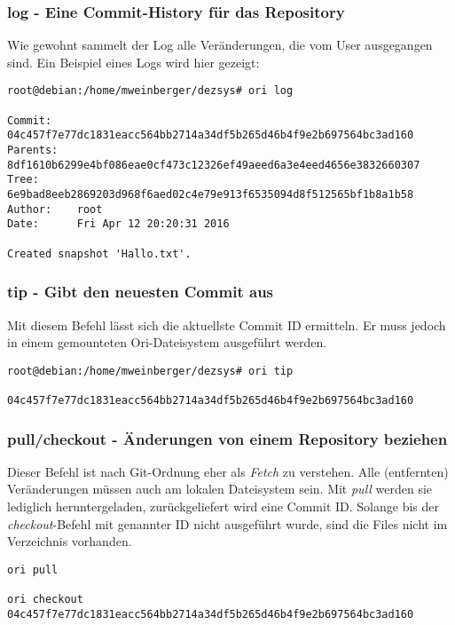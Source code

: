 \subsubsection{log - Eine Commit-History für das Repository}
\label{subsubsec:log - Eine Commit-History für das Repository}
Wie gewohnt sammelt der Log alle Veränderungen, die vom User ausgegangen sind. Ein Beispiel eines Logs wird hier gezeigt:
\begin{lstlisting}[frame=single, caption=log]
root@debian:/home/mweinberger/dezsys# ori log

Commit:    04c457f7e77dc1831eacc564bb2714a34df5b265d46b4f9e2b697564bc3ad160
Parents:   8df1610b6299e4bf086eae0cf473c12326ef49aeed6a3e4eed4656e3832660307
Tree:      6e9bad8eeb2869203d968f6aed02c4e79e913f6535094d8f512565bf1b8a1b58
Author:    root
Date:      Fri Apr 12 20:20:31 2016

Created snapshot 'Hallo.txt'.
\end{lstlisting}

\subsubsection{tip - Gibt den neuesten Commit aus}
\label{subsubsec:tip - Gibt den neuesten Commit aus}
Mit diesem Befehl lässt sich die aktuellste Commit ID ermitteln. Er muss jedoch in einem gemounteten Ori-Dateisystem ausgeführt werden.
\begin{lstlisting}[frame=single, caption=tip]
root@debian:/home/mweinberger/dezsys# ori tip

04c457f7e77dc1831eacc564bb2714a34df5b265d46b4f9e2b697564bc3ad160
\end{lstlisting}

\subsubsection{pull/checkout - Änderungen von einem Repository beziehen}
\label{subsubsec:pull/checkout - Änderungen von einem Repository beziehen}
Dieser Befehl ist nach Git-Ordnung eher als \textit{Fetch} zu verstehen. Alle (entfernten) Veränderungen müssen auch am lokalen Dateisystem sein. Mit \textit{pull} werden sie lediglich heruntergeladen, zurückgeliefert wird eine Commit ID. Solange bis der \textit{checkout}-Befehl mit genannter ID nicht ausgeführt wurde, sind die Files nicht im Verzeichnis vorhanden.
\begin{lstlisting}[frame=single, caption=pull]
ori pull

ori checkout 04c457f7e77dc1831eacc564bb2714a34df5b265d46b4f9e2b697564bc3ad160
\end{lstlisting}

